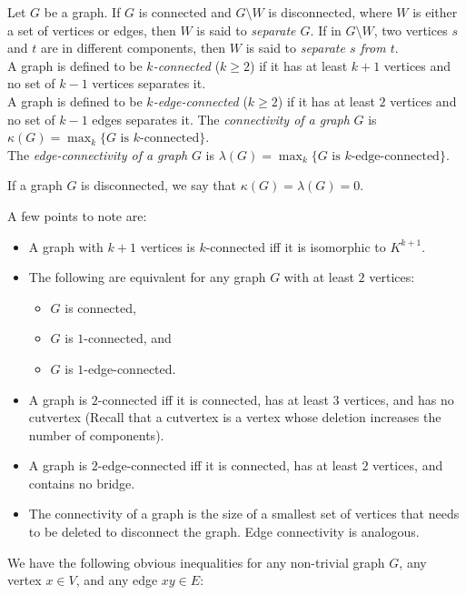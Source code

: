 \begin{fdef}
Let $G$ be a graph. If $G$ is connected and $G\setminus W$ is disconnected, where $W$ is either a set of vertices or edges, then $W$ is said to \textit{separate $G$}. If in $G\setminus W$, two vertices $s$ and $t$ are in different components, then $W$ is said to \textit{separate $s$ from $t$}.\\
A graph is defined to be \textit{$k$-connected} ($k\geq 2$) if it has at least $k+1$ vertices and no set of $k-1$ vertices separates it.\\
A graph is defined to be \textit{$k$-edge-connected} ($k\geq 2$) if it has at least $2$ vertices and no set of $k-1$ edges separates it.
The \textit{connectivity of a graph} $G$ is $\kappa(G)=\max_k \{G\text{ is }k\text{-connected}\}$.\\
The \textit{edge-connectivity of a graph} $G$ is $\lambda(G)=\max_k \{G\text{ is }k\text{-edge-connected}\}$.\\
\end{fdef}

If a graph $G$ is disconnected, we say that $\kappa(G)=\lambda(G)=0$.

A few points to note are:
\begin{itemize}
    \item A graph with $k+1$ vertices is $k$-connected iff it is isomorphic to $K^{k+1}$.
    \item The following are equivalent for any graph $G$ with at least $2$ vertices:
    \begin{itemize}
        \item $G$ is connected,
        \item $G$ is $1$-connected, and
        \item $G$ is $1$-edge-connected.
    \end{itemize}
    \item A graph is $2$-connected iff it is connected, has at least $3$ vertices, and has no cutvertex (Recall that a cutvertex is a vertex whose deletion increases the number of components).
    \item A graph is $2$-edge-connected iff it is connected, has at least $2$ vertices, and contains no bridge.
    \item The connectivity of a graph is the size of a smallest set of vertices that needs to be deleted to disconnect the graph. Edge connectivity is analogous.
\end{itemize}

We have the following obvious inequalities for any non-trivial graph $G$, any vertex $x\in V$, and any edge $xy\in E$:

